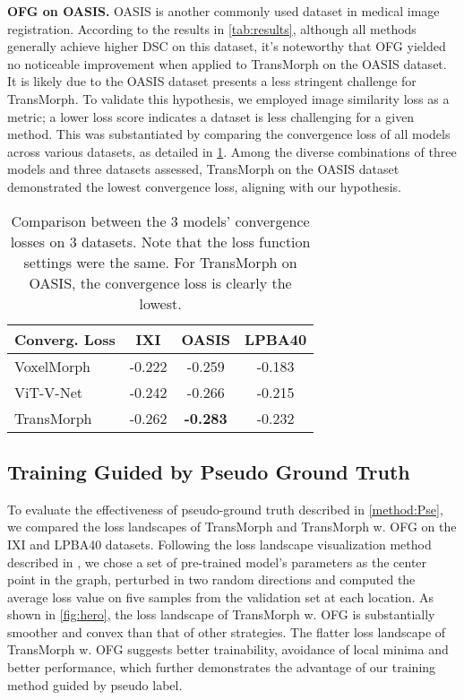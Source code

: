 \documentclass[10pt,twocolumn,letterpaper]{article}
\begin{document}
\textbf{OFG on OASIS.} OASIS \cite{10.1162/jocn.2007.19.9.1498} is another commonly used dataset in medical image registration. According to the results in \cref{tab:results}, although all methods generally achieve higher DSC on this dataset, it's noteworthy that OFG yielded no noticeable improvement when applied to TransMorph on the OASIS dataset. It is likely due to the OASIS dataset presents a less stringent challenge for TransMorph. To validate this hypothesis, we employed image similarity loss as a metric; a lower loss score indicates a dataset is less challenging for a given method. This was substantiated by comparing the convergence loss of all models across various datasets, as detailed in \cref{tab:converg-loss}. Among the diverse combinations of three models and three datasets assessed, TransMorph on the OASIS dataset demonstrated the lowest convergence loss, aligning with our hypothesis.







\begin{table}
\begin{center}
{\small{
    \begin{tabular}{l|ccc}
\toprule
    Converg. Loss & IXI \cite{ixi} & OASIS \cite{10.1162/jocn.2007.19.9.1498} & LPBA40 \cite{lpba} \\
    \midrule
    VoxelMorph \cite{Balakrishnan_2019} & -0.222 & -0.259 & -0.183 \\
    ViT-V-Net \cite{chen2021vitvnet} & -0.242 & -0.266 & -0.215 \\
    TransMorph \cite{Chen_2022} & -0.262 & \textbf{-0.283} & -0.232 \\
    \bottomrule
    \end{tabular}
}}
\end{center}
\caption{Comparison between the 3 models' convergence losses on 3 datasets. Note that the loss function settings were the same. For TransMorph on OASIS, the convergence loss is clearly the lowest.}
\label{tab:converg-loss}
\end{table}



\subsection{Training Guided by Pseudo Ground Truth}
To evaluate the effectiveness of pseudo-ground truth described in \cref{method:Pse}, we compared the loss landscapes of TransMorph and TransMorph w. OFG on the IXI and LPBA40 datasets.
Following the loss landscape visualization method described in \cite{li2018visualizing, goodfellow2015qualitatively, im2017empirical}, we chose a set of pre-trained model's parameters  as the center point in the graph, perturbed  in two random directions 
and computed the average loss value on five samples from the validation set at each location. 
As shown in \cref{fig:hero}, the loss landscape of TransMorph w. OFG is substantially smoother and convex than that of other strategies. The flatter loss landscape of TransMorph w. OFG suggests better trainability, avoidance of local minima and better performance, which further demonstrates the advantage of our training method guided by pseudo label.
\end{document}
